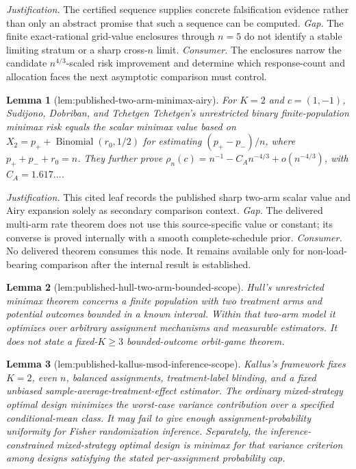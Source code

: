 \documentclass{article}
\newtheorem{lemma}{Lemma}
\begin{document}
\par\smallskip\noindent \textit{Justification.} The certified sequence supplies concrete falsification evidence rather than only an abstract promise that such a sequence can be computed. \textit{Gap.} The finite exact-rational grid-value enclosures through \(n=5\) do not identify a stable limiting stratum or a sharp cross-\(n\) limit. \textit{Consumer.} The enclosures narrow the candidate \(n^{4/3}\)-scaled risk improvement and determine which response-count and allocation faces the next asymptotic comparison must control.

\begin{lemma}[lem:published-two-arm-minimax-airy]\label{lem:published-two-arm-minimax-airy}
For \(K=2\) and \(c=(1,-1)\), Sudijono, Dobriban, and Tchetgen Tchetgen's unrestricted binary finite-population minimax risk equals the scalar minimax value based on \(X_2=p_++\operatorname{Binomial}(r_0,1/2)\) for estimating \((p_+-p_-)/n\), where \(p_++p_-+r_0=n\).  They further prove \(\rho_n(c)=n^{-1}-C_A n^{-4/3}+o(n^{-4/3})\), with \(C_A=1.617\ldots\).
\end{lemma}
\par\smallskip\noindent \textit{Justification.} This cited leaf records the published sharp two-arm scalar value and Airy expansion solely as secondary comparison context. \textit{Gap.} The delivered multi-arm rate theorem does not use this source-specific value or constant; its converse is proved internally with a smooth complete-schedule prior. \textit{Consumer.} No delivered theorem consumes this node. It remains available only for non-load-bearing comparison after the internal result is established.

\begin{lemma}[lem:published-hull-two-arm-bounded-scope]\label{lem:published-hull-two-arm-bounded-scope}
Hull's unrestricted minimax theorem concerns a finite population with two treatment arms and potential outcomes bounded in a known interval. Within that two-arm model it optimizes over arbitrary assignment mechanisms and measurable estimators. It does not state a fixed-\(K\geq3\) bounded-outcome orbit-game theorem.
\end{lemma}

\begin{lemma}[lem:published-kallus-msod-inference-scope]\label{lem:published-kallus-msod-inference-scope}
Kallus's framework fixes \(K=2\), even \(n\), balanced assignments, treatment-label blinding, and a fixed unbiased sample-average-treatment-effect estimator. The ordinary mixed-strategy optimal design minimizes the worst-case variance contribution over a specified conditional-mean class. It may fail to give enough assignment-probability uniformity for Fisher randomization inference. Separately, the inference-constrained mixed-strategy optimal design is minimax for that variance criterion among designs satisfying the stated per-assignment probability cap.
\end{lemma}
\end{document}
